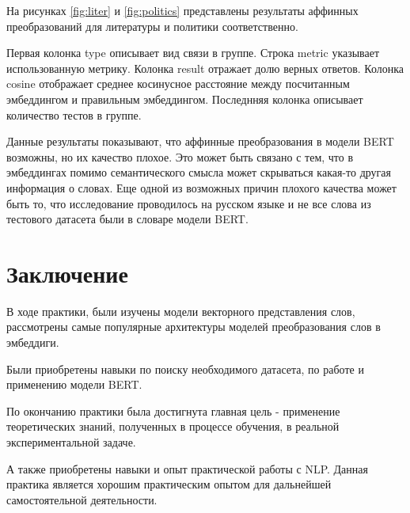 \documentclass[a4paper,14pt]{article}
\begin{document}
	На рисунках \ref{fig:liter} и \ref{fig:politics} представлены результаты аффинных преобразований для литературы и политики соответственно.
	
	Первая колонка type описывает вид связи в группе.
	Строка metric указывает использованную метрику.
	Колонка result отражает долю верных ответов.
	Колонка cosine отображает среднее косинусное расстояние между посчитанным эмбеддингом и правильным эмбеддингом.
	Последнняя колонка описывает количество тестов в группе.
	
	Данные результаты показывают, что аффинные преобразования в модели BERT возможны, но их качество плохое.
	Это может быть связано с тем, что в эмбеддингах помимо семантического смысла может скрываться какая-то другая информация о словах.
	Еще одной из возможных причин плохого качества может быть то, что исследование проводилось на русском языке и не все слова из тестового датасета были в словаре модели BERT.
	
	
	\pagebreak
	\section{Заключение}
	
	В ходе практики, были изучены модели векторного представления слов, рассмотрены самые популярные архитектуры моделей преобразования слов в эмбеддиги.
	
	Были приобретены навыки по поиску необходимого датасета, по работе и применению модели BERT.
	
	По окончанию практики была достигнута главная цель - применение теоретических знаний, полученных в процессе обучения, в реальной экспериментальной задаче.
	
	А также приобретены навыки и опыт практической работы с NLP.
	Данная практика является хорошим практическим опытом для дальнейшей самостоятельной деятельности.
	
	\newpage 
	\renewcommand{\refname}{{\normalsize Список использованных источников}} 
	\centering 
	
	
\end{document}
